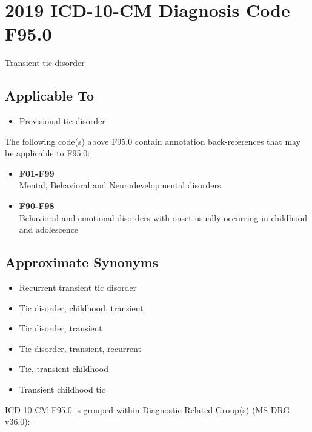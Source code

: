\hypertarget{icd-10-cm-diagnosis-code-f95.0}{%
\section{2019 ICD-10-CM Diagnosis Code F95.0}\label{icd-10-cm-diagnosis-code-f95.0}}

Transient tic disorder

\hypertarget{applicable-to}{%
\subsection{Applicable To}\label{applicable-to}}

\begin{itemize}
\tightlist
\item
  Provisional tic disorder
\end{itemize}

The following code(s) above F95.0 contain annotation back-references that may be applicable to F95.0:

\begin{itemize}
\tightlist
\item
  \textbf{F01-F99}\\
  Mental, Behavioral and Neurodevelopmental disorders
\item
  \textbf{F90-F98}\\
  Behavioral and emotional disorders with onset usually occurring in childhood and adolescence
\end{itemize}

\hypertarget{approximate-synonyms}{%
\subsection{Approximate Synonyms}\label{approximate-synonyms}}

\begin{itemize}
\tightlist
\item
  Recurrent transient tic disorder
\item
  Tic disorder, childhood, transient
\item
  Tic disorder, transient
\item
  Tic disorder, transient, recurrent
\item
  Tic, transient childhood
\item
  Transient childhood tic
\end{itemize}

ICD-10-CM F95.0 is grouped within Diagnostic Related Group(s) (MS-DRG v36.0):

